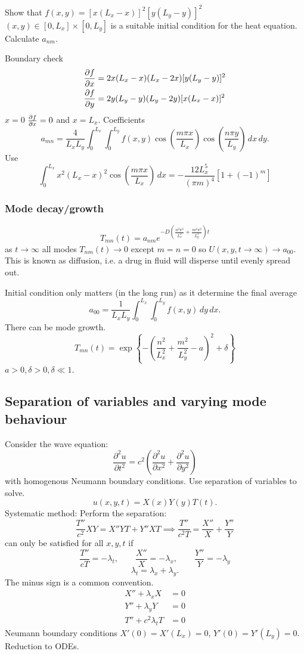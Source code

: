 \documentclass[10pt, a4paper]{article}
\begin{document}
\begin{example}
    Show that $f(x, y) = [x(L_x - x)] ^ 2[y(L_y - y)] ^ 2$ $(x, y) \in [0, L_x] \times [0, L_y]$ is a suitable initial condition for the heat equation.
    Calculate $a_{nm}$.

    Boundary check
    \begin{align*}
        \pd[f]{x} &= 2x(L_x - x)(L_x - 2x)[y(L_y - y)] ^ 2 \\
        \pd[f]{y} &= 2y(L_y - y)(L_y - 2y)[x(L_x - x)] ^ 2
    \end{align*}
    $x = 0$ $\pd[f]{x} = 0$ and $x = L_x$.
    Coefficients
    \[
    a_{mn} = \frac{4}{L_xL_y}\int_{0}^{L_x}\int_{0}^{L_y}f(x, y)\cos\left(\frac{m\pi x}{L_x}\right)\cos\left(\frac{n\pi y}{L_y}\right)\,dx\,dy.
    \]
    Use
    \[
    \int_{0}^{L_x}x ^ 2(L_x - x) ^ 2\cos\left(\frac{m\pi x}{L_x}\right)\,dx = -\frac{12L_x ^ 5}{(\pi m) ^ 4}[1 + (-1) ^ m]
    \]
\end{example}

\subsubsection{Mode decay/growth}
\[
T_{mn}(t) = a_{nm}e ^ {-D\left(\frac{n ^ 2\pi ^ 2}{L_x ^ 2} + \frac{m ^ 2\pi ^ 2}{L_y ^ 2}\right)t}
\]
as $t \to \infty$ all modes $T_{nm}(t) \to 0$ except $m = n = 0$ so $U(x, y, t \to \infty) \to a_{00}$.
This is known as diffusion,
i.e. a drug in fluid will disperse until evenly spread out.

Initial condition only matters
(in the long run)
as it determine the final average
\[
a_{00} = \frac{1}{L_xL_y}\int_{0}^{L_x}\int_{0}^{L_y}f(x, y)\,dy\,dx.
\]
There can be mode growth.
\[
T_{mn}(t) = \exp\left\{-\left(\frac{n ^ 2}{L_x ^ 2} + \frac{m ^ 2}{L_y ^ 2} - a\right) ^ 2 + \delta\right\}
\]
$a > 0, \delta > 0, \delta \ll 1$.

\subsection{Separation of variables and varying mode behaviour}
Consider the wave equation:
\[
\frac{\partial ^ 2u}{\partial t ^ 2} = c ^ 2\left(\frac{\partial ^ 2u}{\partial x ^ 2} + \frac{\partial ^ 2u}{\partial y ^ 2}\right)
\]
with homogenous Neumann boundary conditions.
Use separation of variables to solve.
\[
u(x, y, t) = X(x)Y(y)T(t).
\]
Systematic method:
Perform the separation:
\[
\frac{T''}{c ^ 2}XY = X''YT + Y''XT \implies \frac{T''}{c ^ 2T} = \frac{X''}{X} + \frac{Y''}{Y}
\]
can only be satisfied for all $x, y, t$ if
\[
\frac{T''}{cT} = -\lambda_t,\qquad \frac{X''}{X} = -\lambda_x,\qquad \frac{Y''}{Y} = -\lambda_y
\]
\[
\lambda_t = \lambda_x + \lambda_y.
\]
The minus sign is a common convention.
\begin{align*}
    X'' + \lambda_xX &= 0 \\
    Y'' + \lambda_yY &= 0 \\
    T'' + c ^ 2\lambda_tT &= 0
\end{align*}
Neumann boundary conditions $X'(0) = X'(L_x) = 0$,
$Y'(0) = Y'(L_y) = 0$.
Reduction to ODEs.
\end{document}
